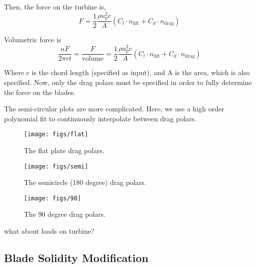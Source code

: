 Then, the force on the turbine is, 
\begin{equation}
 \boxed{F = \frac{1}{2}\frac{\rho u_p^2 c}{A}\left(C_l \cdot
					      n_\text{lift} + C_d \cdot n_\text{drag}  \right)}
\end{equation}

Volumetric force is
\begin{equation}
 \boxed{\frac{n F}{2 \pi r t} = \frac{F}{\text{volume}}= \frac{1}{2}\frac{\rho u_p^2 c}{A}\left(C_l \cdot
					      n_\text{lift} + C_d \cdot n_\text{drag}  \right)}
\end{equation}


Where c is the chord length (specified as input), and A is the area,
which is also specified. Now, only the drag polars must be specified in
order to fully determine the force on the blades.

The semi-circular plots are more complicated. Here, we use a high order
polynomial fit to continuously interpolate between drag polars. 

\begin{figure}[!htb]
  \begin{center}
    \texttt{[image: figs/flat]}
    \caption{The flat plate drag polars.} 
    \label{fig:flat_plate_drag}
  \end{center}
\end{figure}

\begin{figure}[!htb]
  \begin{center}
    \texttt{[image: figs/semi]}
    \caption{The semicircle (180 degree) drag polars.} 
    \label{fig:semi_drag}
  \end{center}
\end{figure}

\begin{figure}[!htb]
  \begin{center}
    \texttt{[image: figs/90]}
    \caption{The 90 degree drag polars.} 
    \label{fig:90_drag}
  \end{center}
\end{figure}

what about loads on turbine?

\subsection{Blade Solidity Modification}

%
%

